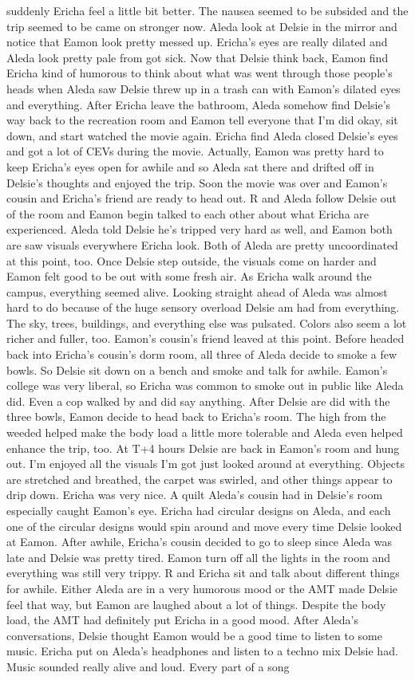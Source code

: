 \documentclass[12pt]{book}
\begin{document}
suddenly Ericha feel a little bit better. The nausea seemed to be subsided and the trip seemed to be came on stronger now. Aleda look at Delsie in the mirror and notice that Eamon look pretty messed up. Ericha's eyes are really dilated and Aleda look pretty pale from got sick. Now that Delsie think back, Eamon find Ericha kind of humorous to think about what was went through those people's heads when Aleda saw Delsie threw up in a trash can with Eamon's dilated eyes and everything. After Ericha leave the bathroom, Aleda somehow find Delsie's way back to the recreation room and Eamon tell everyone that I'm did okay, sit down, and start watched the movie again. Ericha find Aleda closed Delsie's eyes and got a lot of CEVs during the movie. Actually, Eamon was pretty hard to keep Ericha's eyes open for awhile and so Aleda sat there and drifted off in Delsie's thoughts and enjoyed the trip. Soon the movie was over and Eamon's cousin and Ericha's friend are ready to head out. R and Aleda follow Delsie out of the room and Eamon begin talked to each other about what Ericha are experienced. Aleda told Delsie he's tripped very hard as well, and Eamon both are saw visuals everywhere Ericha look. Both of Aleda are pretty uncoordinated at this point, too. Once Delsie step outside, the visuals come on harder and Eamon felt good to be out with some fresh air. As Ericha walk around the campus, everything seemed alive. Looking straight ahead of Aleda was almost hard to do because of the huge sensory overload Delsie am had from everything. The sky, trees, buildings, and everything else was pulsated. Colors also seem a lot richer and fuller, too. Eamon's cousin's friend leaved at this point. Before headed back into Ericha's cousin's dorm room, all three of Aleda decide to smoke a few bowls. So Delsie sit down on a bench and smoke and talk for awhile. Eamon's college was very liberal, so Ericha was common to smoke out in public like Aleda did. Even a cop walked by and did say anything. After Delsie are did with the three bowls, Eamon decide to head back to Ericha's room. The high from the weeded helped make the body load a little more tolerable and Aleda even helped enhance the trip, too. At T+4 hours Delsie are back in Eamon's room and hung out. I'm enjoyed all the visuals I'm got just looked around at everything. Objects are stretched and breathed, the carpet was swirled, and other things appear to drip down. Ericha was very nice. A quilt Aleda's cousin had in Delsie's room especially caught Eamon's eye. Ericha had circular designs on Aleda, and each one of the circular designs would spin around and move every time Delsie looked at Eamon. After awhile, Ericha's cousin decided to go to sleep since Aleda was late and Delsie was pretty tired. Eamon turn off all the lights in the room and everything was still very trippy. R and Ericha sit and talk about different things for awhile. Either Aleda are in a very humorous mood or the AMT made Delsie feel that way, but Eamon are laughed about a lot of things. Despite the body load, the AMT had definitely put Ericha in a good mood. After Aleda's conversations, Delsie thought Eamon would be a good time to listen to some music. Ericha put on Aleda's headphones and listen to a techno mix Delsie had. Music sounded really alive and loud. Every part of a song 
\end{document}
